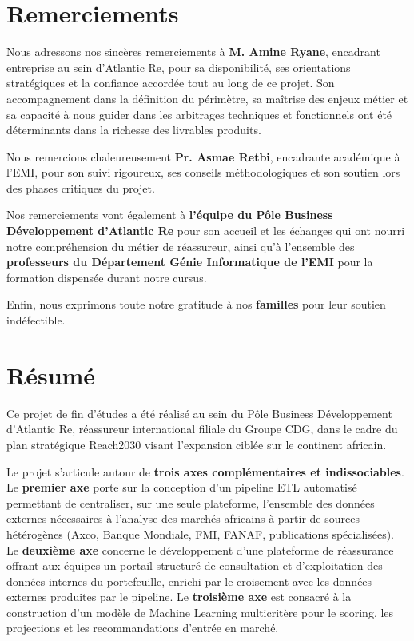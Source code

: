 \documentclass[12pt,a4paper]{report}
\begin{document}
\chapter*{Remerciements}

Nous adressons nos sincères remerciements à \textbf{M. Amine Ryane}, encadrant
entreprise au sein d'Atlantic Re, pour sa disponibilité, ses orientations stratégiques
et la confiance accordée tout au long de ce projet. Son accompagnement dans la
définition du périmètre, sa maîtrise des enjeux métier et sa capacité à nous guider
dans les arbitrages techniques et fonctionnels ont été déterminants dans la richesse
des livrables produits.

Nous remercions chaleureusement \textbf{Pr. Asmae Retbi}, encadrante académique à
l'EMI, pour son suivi rigoureux, ses conseils méthodologiques et son soutien lors des
phases critiques du projet.

Nos remerciements vont également à \textbf{l'équipe du Pôle Business Développement
d'Atlantic Re} pour son accueil et les échanges qui ont nourri notre compréhension
du métier de réassureur, ainsi qu'à l'ensemble des \textbf{professeurs du Département
Génie Informatique de l'EMI} pour la formation dispensée durant notre cursus.

Enfin, nous exprimons toute notre gratitude à nos \textbf{familles} pour leur
soutien indéfectible.

\clearpage

\chapter*{Résumé}

Ce projet de fin d'études a été réalisé au sein du Pôle Business Développement
d'Atlantic Re, réassureur international filiale du Groupe CDG, dans le cadre du
plan stratégique Reach2030 visant l'expansion ciblée sur le continent africain.

Le projet s'articule autour de \textbf{trois axes complémentaires et indissociables}.
Le \textbf{premier axe} porte sur la conception d'un pipeline ETL automatisé
permettant de centraliser, sur une seule plateforme, l'ensemble des données
externes nécessaires à l'analyse des marchés africains à partir de sources
hétérogènes (Axco, Banque Mondiale, FMI, FANAF, publications spécialisées).
Le \textbf{deuxième axe} concerne le développement d'une plateforme de réassurance
offrant aux équipes un portail structuré de consultation et d'exploitation des
données internes du portefeuille, enrichi par le croisement avec les données
externes produites par le pipeline. Le \textbf{troisième axe} est consacré à la
construction d'un modèle de Machine Learning multicritère pour le scoring, les
projections et les recommandations d'entrée en marché.
\end{document}
